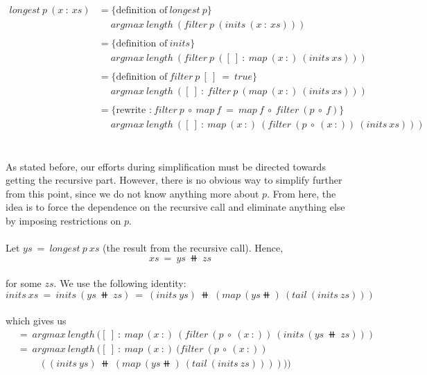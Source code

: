 \begin{equation}
\begin{split}
longest\: p\: (x \: : \: xs) &= \{\text{definition of}\: longest \: p\} \\ &\quad \; argmax \: length \: (filter \: p \: (inits \: (x \: : \: xs))) \\\\
&= \{\text{definition of}\: inits\} \\ &\quad \; argmax \: length \: (filter \: p\: ([\: ] \: : \: map \: (x \: :) \: (inits \: xs))) \\\\
&= \{\text{definition of}\: filter \: p\: [ \: ] \: = \: true\} \\ &\quad \; argmax \: length \: ([ \: ] \: :\: filter \: p \: (map\: (x\: :)\: (inits\: xs))) \\\\
&= \{\text{rewrite :}\: filter\: p\: \circ\: map\: f\: =\: map\: f\: \circ\: filter\: (p\: \circ\: f)\} \\ &\quad \; argmax \: length\: ([\: ]\: :\: map\: (x\: :)\: (filter\: (p\: \circ\: (x\: :))\: (inits\: xs)))
\end{split}
\end{equation}\\\\
As stated before, our efforts during simplification must be directed towards getting the recursive part. However, there is no obvious way to simplify further from this point, since we do not know anything more about $p$. From here, the idea is to force the dependence on the recursive call and eliminate anything else by imposing restrictions on $p$.\\\\
Let $ys \: =\: longest\: p \: xs$ (the result from the recursive call). Hence,
\begin{equation}
xs\: = \: ys \: \doubleplus \: zs
\end{equation}\\
for some $zs$. We use the following identity:\\
\begin{equation*}
inits \: xs \: =\:  inits\:  (ys \: \doubleplus \: zs) \: = \: (inits \: ys) \: \doubleplus \:  (map \: (ys \doubleplus) \: (tail \: (inits \: zs)))
\end{equation*}\\
which gives us\\
\begin{equation*}
\begin{split}
&= \: argmax \: length \: ([ \: ] \: : \: map \: (x \: :) \: (filter \: (p \: \circ \: (x \: :)) \: (inits \: (ys \: \doubleplus \: zs)))\\
&= \: argmax \: length \: ([ \: ] \: : \: map \: (x \: :) \: (filter \: (p \: \circ \: (x \: :))\\
&\qquad \; ((inits \: ys) \: \doubleplus \: (map \: (ys\doubleplus) \: (tail \: (inits \: zs))))))
\end{split}
\end{equation*}\\

